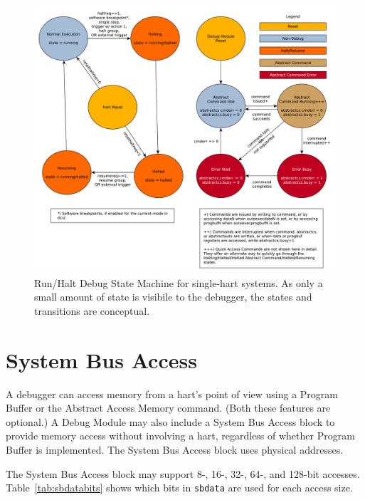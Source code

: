 \begin{figure}
   \centering
   \includegraphics[width=\textwidth]{fig/abstract_commands.pdf}
   \caption[Run/Halt Debug State Machine]{Run/Halt Debug State Machine for single-hart systems.
     As only a small amount of state is visibile to the debugger,
     the states and transitions are conceptual.}
   \label{fig:abstract_sm}
\end{figure}

\section{System Bus Access} \label{systembusaccess}

A debugger can access memory from a hart's point of view using a Program Buffer or
the Abstract Access Memory command. (Both these features are optional.)
A Debug Module may also include a System Bus Access block to provide memory
access without
involving a hart, regardless of whether Program Buffer is implemented.
The System Bus Access block uses physical addresses.

The System Bus Access block may support 8-, 16-, 32-, 64-, and 128-bit
accesses. Table~\ref{tab:sbdatabits} shows which bits in {\tt sbdata} are used
for each access size.

